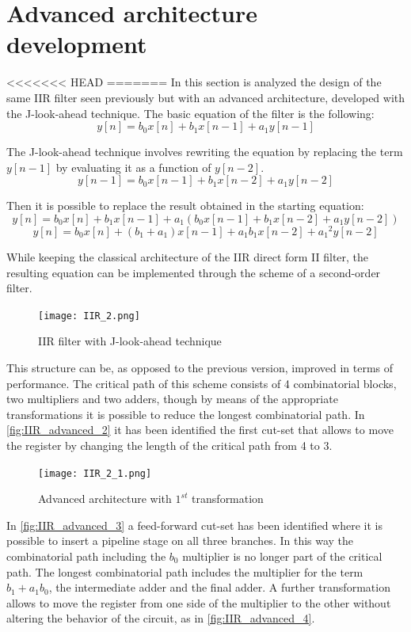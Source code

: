 \section{Advanced architecture development}
<<<<<<< HEAD
=======
In this section is analyzed the design of the same IIR filter seen previously but with an advanced architecture, developed with the J-look-ahead technique. The basic equation of the filter is the following:
$$ y[n] = b_0x[n] + b_1x[n-1] + a_1y[n-1]$$

The J-look-ahead technique involves rewriting the equation by replacing the term $y[n-1]$ by evaluating it as a function of $y[n-2]$.
$$ y[n-1] = b_0x[n-1] + b_1x[n-2] + a_1y[n-2]$$

Then it is possible to replace the result obtained in the starting equation:
$$ y[n] = b_0x[n] + b_1x[n-1] + a_1(b_0x[n-1] + b_1x[n-2] + a_1y[n-2])$$
$$ y[n] = b_0x[n] + (b_1 + a_1)x[n-1] + a_1b_1x[n-2] + {a_1}^{2}y[n-2]$$

While keeping the classical architecture of the IIR direct form II filter, the resulting equation can be implemented through the scheme of a second-order filter.

\begin{figure}[h]
	\center
	\texttt{[image: IIR\_2.png]}
	\caption{IIR filter with J-look-ahead technique}
	\label{fig:IIR_advanced}
\end{figure}

This structure can be, as opposed to the previous version, improved in terms of performance. The critical path of this scheme consists of 4 combinatorial blocks, two multipliers and two adders, though by means of the appropriate transformations it is possible to reduce the longest combinatorial path.  In \autoref{fig:IIR_advanced_2} it has been identified the first cut-set that allows to move the register by changing the length of the critical path from 4 to 3.

\begin{figure}[htb]
	\center
	\texttt{[image: IIR\_2\_1.png]}
	\caption{Advanced architecture with $1^{st}$ transformation}
	\label{fig:IIR_advanced_2}
\end{figure}

In \autoref{fig:IIR_advanced_3} a feed-forward cut-set has been identified where it is possible to insert a pipeline stage on all three branches. In this way the combinatorial path including the $b_0$ multiplier is no longer part of the critical path. The longest combinatorial path includes the multiplier for the term $b_1 + a_1b_0$, the intermediate adder and the final adder. A further transformation allows to move the register from one side of the multiplier to the other without altering the behavior of the circuit, as in \autoref{fig:IIR_advanced_4}.

